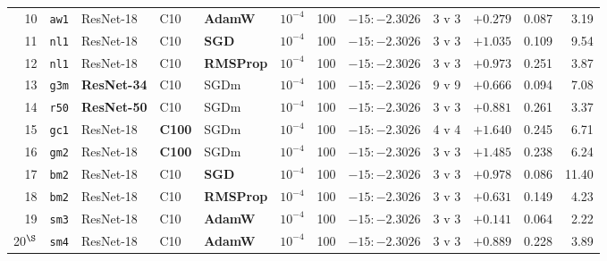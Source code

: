 \documentclass[10pt,letterpaper]{article}
\newcommand{\arm}[1]{\texttt{#1}}
\begin{document}
\begin{table}[htbp]
\begin{tabular}{@{}rllllllcrrrr@{}}
10 & \arm{aw1} & ResNet-18 & C10 & \textbf{AdamW} & $10^{-4}$ & 100 & $-15{:}{-}2.3026$ &
     3 v 3 & $\mathbf{+0.279}$ & 0.087 & 3.19 \\
11 & \arm{nl1} & ResNet-18 & C10 & \textbf{SGD} & $10^{-4}$ & 100 & $-15{:}{-}2.3026$ & 3 v 3 &
     $\mathbf{+1.035}$ & 0.109 & 9.54 \\
12 & \arm{nl1} & ResNet-18 & C10 & \textbf{RMSProp} & $10^{-4}$ & 100 & $-15{:}{-}2.3026$ &
     3 v 3 & $\mathbf{+0.973}$ & 0.251 & 3.87 \\
13 & \arm{g3m} & \textbf{ResNet-34} & C10 & SGDm & $10^{-4}$ & 100 & $-15{:}{-}2.3026$ & 9 v 9 &
     $\mathbf{+0.666}$ & 0.094 & 7.08 \\
14 & \arm{r50} & \textbf{ResNet-50} & C10 & SGDm & $10^{-4}$ & 100 & $-15{:}{-}2.3026$ & 3 v 3 &
     $\mathbf{+0.881}$ & 0.261 & 3.37 \\
15 & \arm{gc1} & ResNet-18 & \textbf{C100} & SGDm & $10^{-4}$ & 100 & $-15{:}{-}2.3026$ &
     4 v 4 & $\mathbf{+1.640}$ & 0.245 & 6.71 \\
16 & \arm{gm2} & ResNet-18 & \textbf{C100} & SGDm & $10^{-4}$ & 100 & $-15{:}{-}2.3026$ &
     3 v 3 & $\mathbf{+1.485}$ & 0.238 & 6.24 \\
17 & \arm{bm2} & ResNet-18 & C10 & \textbf{SGD} & $10^{-4}$ & 100 & $-15{:}{-}2.3026$ & 3 v 3 &
     $\mathbf{+0.978}$ & 0.086 & 11.40 \\
18 & \arm{bm2} & ResNet-18 & C10 & \textbf{RMSProp} & $10^{-4}$ & 100 & $-15{:}{-}2.3026$ &
     3 v 3 & $\mathbf{+0.631}$ & 0.149 & 4.23 \\
19 & \arm{sm3} & ResNet-18 & C10 & \textbf{AdamW} & $10^{-4}$ & 100 & $-15{:}{-}2.3026$ & 3 v 3 &
     $\mathbf{+0.141}$ & 0.064 & 2.22 \\
20$^{\S}$ & \arm{sm4} & ResNet-18 & C10 & \textbf{AdamW} & $10^{-4}$ & 100 &
     $-15{:}{-}2.3026$ & 3 v 3 & $\mathbf{+0.889}$ & 0.228 & 3.89 \\
\bottomrule
\end{tabular}


\end{table}
\end{document}
